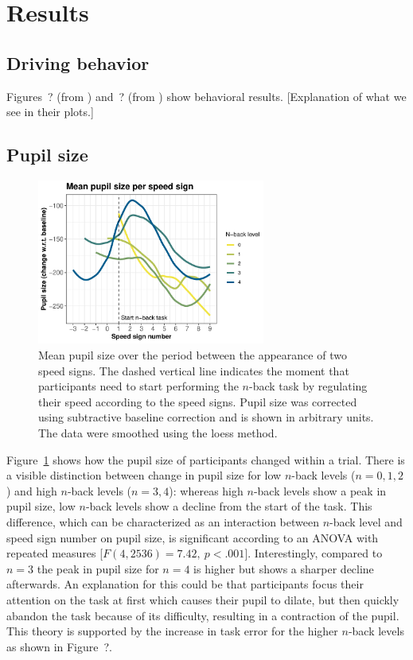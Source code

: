 
\section{Results}\label{sec:results}
\subsection{Driving behavior}
Figures~? (from \citet{DeMooij2021}) and~? (from \citet{Kelapanda2021}) show behavioral results.
[Explanation of what we see in their plots.]

\subsection{Pupil size}
\begin{figure}[tp]
  \centering
  \includegraphics[width=7.5cm]{images/speed_sign_nback.pdf}
  \caption{Mean pupil size over the period between the appearance of two speed signs.
  The dashed vertical line indicates the moment that participants need to start performing the \(n\)-back task by regulating their speed according to the speed signs.
  Pupil size was corrected using subtractive baseline correction and is shown in arbitrary units. 
  The data were smoothed using the loess method.}
  \label{fig:ps-speed-sign}
\end{figure}

Figure~\ref{fig:ps-speed-sign} shows how the pupil size of participants changed within a trial.
There is a visible distinction between change in pupil size for low \(n\)-back levels (\(n = 0,1,2\)) and high \(n\)-back levels (\(n = 3,4\)):
whereas high \(n\)-back levels show a peak in pupil size, low \(n\)-back levels show a decline from the start of the task.
This difference, which can be characterized as an interaction between \(n\)-back level and speed sign number on pupil size, is significant according to an ANOVA with repeated measures [\(F(4,2536)=7.42,\ p < .001\)].
Interestingly, compared to \(n = 3\) the peak in pupil size for \(n = 4\) is higher but shows a sharper decline afterwards.
An explanation for this could be that participants focus their attention on the task at first which causes their pupil to dilate, but then quickly abandon the task because of its difficulty, resulting in a contraction of the pupil.
This theory is supported by the increase in task error for the higher \(n\)-back levels as shown in Figure~?.

